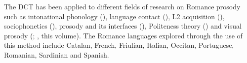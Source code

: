 \documentclass[output=paper]{LSP/langsci}
\begin{document}
The DCT has been applied to different fields of research on Romance prosody such as intonational phonology (\citealt{Prieto.2001,Prieto2007-2012,Prieto2010,Prieto2009-2013,Brehm2014,Frota2015romance,Roseano2015preguntas,Huttenlauch2016}), language contact (\citealt{Sichel-Bazin2015}), L2 acquisition (\citealt{Craft2015,Astruc2016politeness}), sociophonetics (\citealt{Mascaro2015}), prosody and its interfaces (\citealt{Vanrell2014dialectinterrogatives,Vanrell2014sardinianpolar,Vanrell2014evidentiality,ElviraGarcia2017,SanchezAlvarado.2018,Huttenlauch.accepted}), Politeness theory (\citealt{Astruc2011,Astruc2016politeness,Borras-Comes2015}) and visual prosody (\citealt{Cruz2015,Gonzalez-Fuente2015}; \citeauthor{GiliFivela.2018}, this volume). The Romance languages explored through the use of this method include Catalan, French, Friulian, Italian, Occitan, Portuguese, Romanian, Sardinian and Spanish. 
\end{document}
